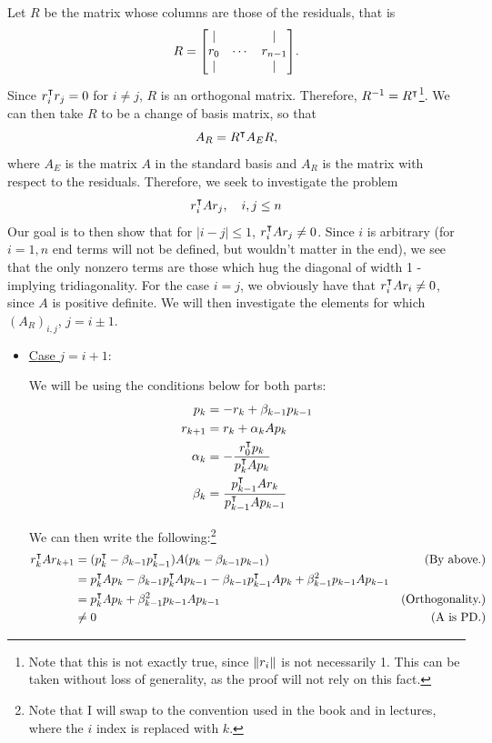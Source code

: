 \begin{solution}

    Let $R$ be the matrix whose columns are those of the residuals, that is 
    \[R = \mqty[|&&|\\r_0&\cdots&r_{n-1}\\|&&|].\]
    Since $r_i^\intercal r_j = 0$ for $i \neq j$, $R$ is an orthogonal matrix. Therefore, $R^{-1} = R^\intercal$\footnote{Note that this is not exactly true, since $\norm{r_i}$ is not necessarily 1. This can be taken without loss of generality, as the proof will not rely on this fact.}. We can then take $R$ to be a change of basis matrix, so that 
    \[A_R = R^\intercal A_E R,\]
    where $A_E$ is the matrix $A$ in the standard basis and $A_R$ is the matrix with respect to the residuals. Therefore, we seek to investigate the problem
    \[r_i^\intercal Ar_j, \quad i, j \leq n\]
    Our goal is to then show that for $|i - j| \leq 1$, $r_i^\intercal A r_j \neq 0$. Since $i$ is arbitrary (for $i = 1, n$ end terms will not be defined, but wouldn't matter in the end), we see that the only nonzero terms are those which hug the diagonal of width 1 - implying tridiagonality. For the case $i = j$, we obviously have that $r_i^\intercal Ar_i \neq 0$, since $A$ is positive definite. We will then investigate the elements for which $(A_R)_{i, j}$, $j = i \pm 1$.
    \begin{itemize}
        \item \underline{Case $j = i+1$}:

        \hop
        We will be using the conditions below for both parts:
        \begin{align}
            p_k &= -r_k + \beta_{k-1}p_{k-1}\\
            r_{k+1} &= r_k + \alpha_k Ap_k\\
            \alpha_k &= -\frac{r_0^\intercal p_k}{p_k^\intercal Ap_k}\\
            \beta_k &= \frac{p_{k-1}^\intercal Ar_k}{p_{k-1}^\intercal Ap_{k-1}}
        \end{align}

        We can then write the following:\footnote{Note that I will swap to the convention used in the book and in lectures, where the $i$ index is replaced with $k$.}
        \tightalignbreak
        \begin{align*}
            r_k^\intercal Ar_{k+1} &= (p_k^\intercal - \beta_{k-1}p_{k-1}^\intercal)A(p_{k} - \beta_{k-1}p_{k-1}) &\text{(By above.)}\\
            &= p_k^\intercal Ap_k -\beta_{k-1}p_k^\intercal Ap_{k-1} -\beta_{k-1}p_{k-1}^\intercal Ap_k + \beta_{k-1}^2 p_{k-1}Ap_{k-1}\\
            &= p_k^\intercal Ap_k +\beta_{k-1}^2 p_{k-1}Ap_{k-1} &\text{(Orthogonality.)}\\
            &\neq 0 &\text{(A is PD.)}
        \end{align*}
        \vspace{-12mm}\alignbreak


\end{itemize}
\end{solution}
